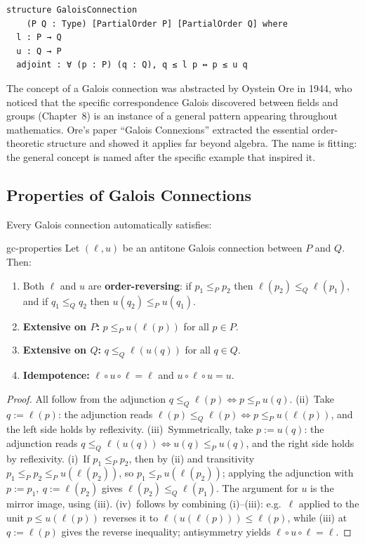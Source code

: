 \documentclass[11pt, a4paper, oneside]{book}
\begin{document}
\begin{leanbox}
\begin{verbatim}
structure GaloisConnection
    (P Q : Type) [PartialOrder P] [PartialOrder Q] where
  l : P → Q
  u : Q → P
  adjoint : ∀ (p : P) (q : Q), q ≤ l p ↔ p ≤ u q
\end{verbatim}
\end{leanbox}

\begin{historical}[title={Ore's Abstraction}]
The concept of a Galois connection was abstracted by Oystein Ore in 1944,
who noticed that the specific correspondence Galois discovered between
fields and groups (Chapter~8) is an instance of a general pattern appearing
throughout mathematics. Ore's paper ``Galois Connexions'' extracted the
essential order-theoretic structure and showed it applies far beyond algebra.
The name is fitting: the general concept is named after the specific example
that inspired it.
\end{historical}

\subsection{Properties of Galois Connections}

Every Galois connection automatically satisfies:

\begin{prop}{}{gc-properties}
Let $(\ell, u)$ be an antitone Galois connection between $P$ and $Q$. Then:
\begin{enumerate}[nosep, label=(\roman*)]
\item Both $\ell$ and $u$ are \textbf{order-reversing}:
  if $p_1 \leq_P p_2$ then $\ell(p_2) \leq_Q \ell(p_1)$, and if
  $q_1 \leq_Q q_2$ then $u(q_2) \leq_P u(q_1)$.
\item \textbf{Extensive on $P$:} $p \leq_P u(\ell(p))$ for all $p \in P$.
\item \textbf{Extensive on $Q$:} $q \leq_Q \ell(u(q))$ for all $q \in Q$.
\item \textbf{Idempotence:} $\ell \circ u \circ \ell = \ell$ and
  $u \circ \ell \circ u = u$.
\end{enumerate}
\end{prop}

\begin{proof}
All follow from the adjunction $q \leq_Q \ell(p) \iff p \leq_P u(q)$.
(ii)~Take $q := \ell(p)$: the adjunction reads
$\ell(p) \leq_Q \ell(p) \iff p \leq_P u(\ell(p))$, and the left side holds by
reflexivity. (iii)~Symmetrically, take $p := u(q)$: the adjunction reads
$q \leq_Q \ell(u(q)) \iff u(q) \leq_P u(q)$, and the right side holds by
reflexivity. (i)~If $p_1 \leq_P p_2$, then by (ii) and transitivity
$p_1 \leq_P p_2 \leq_P u(\ell(p_2))$, so $p_1 \leq_P u(\ell(p_2))$; applying the
adjunction with $p := p_1,\ q := \ell(p_2)$ gives $\ell(p_2) \leq_Q \ell(p_1)$.
The argument for $u$ is the mirror image, using (iii). (iv)~follows by combining
(i)--(iii): e.g.\ $\ell$ applied to the unit $p \leq u(\ell(p))$ reverses it to
$\ell(u(\ell(p))) \leq \ell(p)$, while (iii) at $q := \ell(p)$ gives the reverse
inequality; antisymmetry yields $\ell \circ u \circ \ell = \ell$.
\end{proof}
\end{document}
